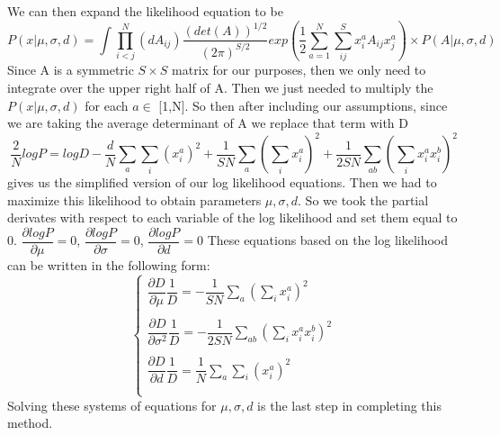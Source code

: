 \documentclass{article}
\begin{document}
We can then expand the likelihood equation to be 
$$
P(x|\mu,\sigma,d)=\int \prod_{i<j}^N(dA_{ij})\dfrac{(det(A))^{1/2}}{(2\pi)^{S/2}} exp(\dfrac{1}{2}\sum_{a=1}^N\sum_{ij}^S x_i^aA_{ij}x_j^a)\times P(A|\mu,\sigma,d)
$$
Since A is a symmetric $S\times S$ matrix for our purposes, then we only need to integrate over the upper right half of A. Then we just needed to multiply the $P(x|\mu,\sigma,d)$ for each $a \in$ [1,N]. \hfill\break \hfill\break So then after including our assumptions, since we are taking the average determinant of A we replace that term with D 
\hfill\break
\begin{equation}
\dfrac{2}{N}logP=logD-\dfrac{d}{N}\sum_{a}\sum_i (x_i^a)^2 +\dfrac{1}{SN}\sum_{a}(\sum_i x_i^a)^2+\dfrac{1}{2SN}\sum_{ab}(\sum_i x_i^a x_i^b)^2 
\end{equation}
gives us the simplified version of our log likelihood equations.
\hfill\break
Then we had to maximize this likelihood to obtain parameters $\mu,\sigma,d$. So we took the partial derivates with respect to each variable of the log likelihood and set them equal to 0. 
\hfill\break\hfill\break
$\dfrac{\partial logP}{\partial \mu}=0$,
$\dfrac{\partial logP}{\partial \sigma}=0$,
$\dfrac{\partial logP}{\partial d}=0$
\hfill\break
These equations based on the log likelihood can be written in the following form:
\begin{equation}
\begin{cases}
\dfrac{\partial D}{\partial \mu} \dfrac{1}{D}=-\dfrac{1}{SN}\sum_{a}(\sum_i x_i^a)^2 \\\\
\dfrac{\partial D}{\partial \sigma^2} \dfrac{1}{D}=-\dfrac{1}{2SN}\sum_{ab}(\sum_i x_i^a x_i^b)^2 \\\\
\dfrac{\partial D}{\partial d} \dfrac{1}{D}=\dfrac{1}{N}\sum_{a}\sum_i (x_i^a)^2 \\\\
\end{cases}
\end{equation}
Solving these systems of equations for $\mu,\sigma, d$ is the last step in completing this method.
\end{document}
